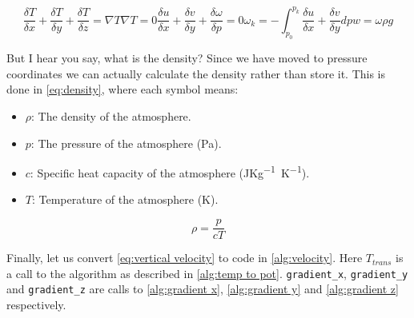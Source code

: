 \begin{subequations}
    \begin{equation}
        \label{eq:velocity}
        \frac{\delta T}{\delta x} + \frac{\delta T}{ \delta y} + \frac{\delta T}{\delta z} = \nabla T
    \end{equation}
    \begin{equation}
        \label{eq:vel eq}
        \nabla T = 0
    \end{equation}
    \begin{equation}
        \label{eq:velocity int}
        \frac{\delta u}{\delta x} + \frac{\delta v}{\delta y} + \frac{\delta\omega}{\delta p} = 0
    \end{equation}
    \begin{equation}
        \label{eq:vert vel}
        \omega_k = -\int^{p_k}_{p_0}\frac{\delta u}{\delta x} + \frac{\delta v}{\delta y} dp
    \end{equation}
    \begin{equation}
        \label{eq:vertical velocity}
        w = \omega \rho g
    \end{equation}
\end{subequations}

But I hear you say, what is the density? Since we have moved to pressure coordinates we can actually calculate the density rather than store it. This is done in \autoref{eq:density}, where each 
symbol means:

\begin{itemize}
    \item $\rho$: The density of the atmosphere.
    \item $p$: The pressure of the atmosphere (\si{Pa}).
    \item $c$: Specific heat capacity of the atmosphere (\si{JKg^{-1}K^{-1}}).
    \item $T$: Temperature of the atmosphere (\si{K}).
\end{itemize}

\begin{equation}
    \label{eq:density}
    \rho = \frac{p}{cT}
\end{equation}

Finally, let us convert \autoref{eq:vertical velocity} to code in \autoref{alg:velocity}. Here $T_{trans}$ is a call to the algorithm as described in \autoref{alg:temp to pot}. 
\texttt{gradient\_x}, \texttt{gradient\_y} and \texttt{gradient\_z} are calls to \autoref{alg:gradient x}, \autoref{alg:gradient y} and \autoref{alg:gradient z} respectively.

